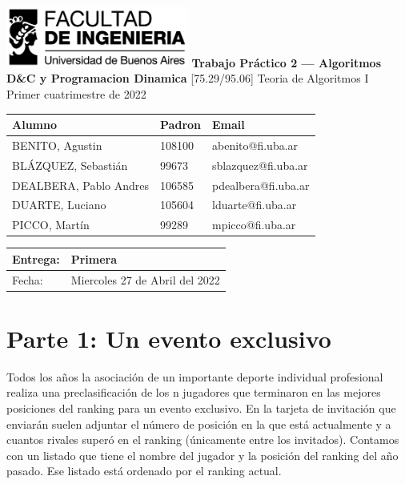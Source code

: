 \documentclass[titlepage,a4paper]{article}
\author{Pablo Andres Dealbera}
\date{\today}
\title{}
\begin{document}
\begin{titlepage}
	\hfill\includegraphics[width=6cm]{assets/logofiuba.jpg}
    \centering
    \vfill
    \Huge \textbf{Trabajo Práctico 2 — Algoritmos D\&C y Programacion Dinamica}
    \vskip2cm
    \Large [75.29/95.06] Teoria de Algoritmos I\\
    Primer cuatrimestre de 2022\\
    \vfill
    \begin{tabular}{ | l | l | l | }
      \hline
      Alumno & Padron & Email \\ \hline
      BENITO, Agustin & 108100 & abenito@fi.uba.ar \\ \hline
      BLÁZQUEZ, Sebastián & 99673 & sblazquez@fi.uba.ar \\ \hline
      DEALBERA, Pablo Andres & 106585 & pdealbera@fi.uba.ar \\ \hline
      DUARTE, Luciano & 105604 & lduarte@fi.uba.ar \\ \hline
      PICCO, Martín & 99289 & mpicco@fi.uba.ar \\ \hline
  	\end{tabular}
    \vfill
    \begin{tabular}{ | l | l | }
      \hline
      Entrega: & Primera \\ \hline
      Fecha: & Miercoles 27 de Abril del 2022 \\ \hline
  	\end{tabular}
    \vfill
    \vfill
\end{titlepage}
\tableofcontents
\newpage
{}

\section{Parte 1: Un evento exclusivo}
\label{sec:orgcfd7d52}
Todos los años la asociación de un importante deporte individual profesional realiza una preclasificación de los n jugadores que terminaron en las mejores posiciones del ranking para un evento exclusivo. En la tarjeta de invitación que enviarán suelen adjuntar el número de posición en la que está actualmente y a cuantos rivales superó en el ranking (únicamente entre los invitados). Contamos con un listado que tiene el nombre del jugador y la posición del ranking del año pasado. Ese listado está ordenado por el ranking actual.
\end{document}
